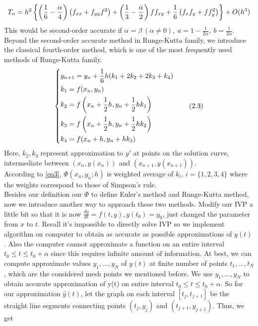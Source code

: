 \documentclass[
11pt, %
a4paper, %
oneside, %
headinclude,footinclude, %
BCOR5mm, %
]{scrartcl}
\begin{document}
\begin{equation}
    T_n=h^2\left\{\left(\frac{1}{6}-\frac{\alpha}{4}\right)\left(f_{xx}+f_{yy}f^2\right)+\left(\frac{1}{3}-\frac{\alpha}{2}\right)ff_{xy}+\frac{1}{6}\left(f_xf_y+ff_y^2\right)\right\}+O(h^3) \notag
\end{equation}
This would be second-order accurate if $\alpha=\beta\ (\alpha\neq 0),\ a=1-\frac{1}{2\alpha},\ b=\frac{1}{2\alpha}$. Beyond the second-order accurate method in Runge-Kutta family, we introduce the classical fourth-order method, which is one of the most frequently used methods of Runge-Kutta family. 
\begin{equation}
\label{eq3}
\centering
\left\{\begin{split}
&y_{n+1}=y_n+\frac{1}{6}h(k_1+2k_2+2k_3+k_4) \\
&k_1=f(x_n,y_n)\\
&k_2=f\left(x_n+\frac{1}{2}h,y_n+\frac{1}{2}hk_1\right)\\
&k_3=f\left(x_n+\frac{1}{2}h,y_n+\frac{1}{2}hk_2\right)\\
&k_4=f(x_n+h,y_n+hk_3)
\end{split}\right.\tag{2.3}
 \end{equation}
Here, $k_2,k_3$ represent approximation to $y'$ at points on the solution curve, intermediate between $(x_n,y(x_n))$ and $(x_{n+1},y(x_{n+1}))$. \\According to \vref{eq3}, $\Phi(x_n,y_n;h)$ is weighted average of $k_i$, $i=\{1,2,3,4\}$ where the weights correspond to those of Simpson's rule. 
\vspace{0.6em}\\Besides our definition our $\Phi$ to define Euler's method and Runge-Kutta method, now we introduce another way to approach these two methods. Modify our IVP a little bit so that it is now $\frac{dy}{dt}=f(t,y), y(t_0)=y_0$, just changed the parameter from $x$ to $t$. Recall it's impossible to directly solve IVP so we implement algorithm on computer to obtain as accurate as possible approximations of $y(t)$. Also the computer cannot approximate a function on an entire interval $t_0\leq t\leq t_0+\alpha$ since this requires infinite amount of information. At best, we can compute approximate values $y_1,...,y_N$ of $y(t)$ at finite number of points $t_1,...,t_N$, which are the considered mesh points we mentioned before. We use $y_1,...,y_N$ to obtain accurate approximation of y(t) on entire interval $t_0\leq t\leq t_0+\alpha$. So for our approximation $\hat{y}(t)$, let the graph on each interval $[t_j,t_{j+1}]$ be the straight line segments connecting points $(t_j,y_j)$ and $(t_{j+1},y_{j+1})$. Thus, we get 
\end{document}
